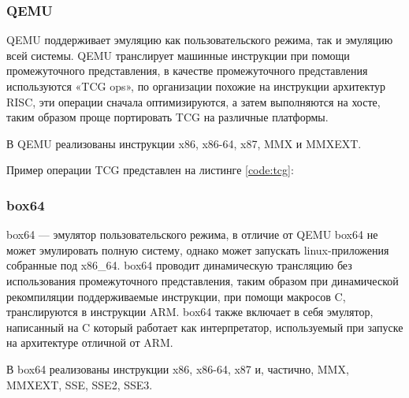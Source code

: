 \subsubsection{QEMU}

QEMU поддерживает эмуляцию как пользовательского режима, так и эмуляцию всей системы. QEMU транслирует машинные инструкции при помощи промежуточного представления, в качестве промежуточного представления используются «TCG ops», по организации похожие на инструкции архитектур RISC, эти операции сначала оптимизируются, а затем выполняются на хосте, таким образом проще портировать TCG на различные платформы. \cite{qemu_readme}

В QEMU реализованы инструкции x86, x86-64, x87, MMX и MMXEXT. 

Пример операции TCG представлен на листинге \ref{code:tcg}:


\subsubsection{box64}

box64 --- эмулятор пользовательского режима, в отличие от QEMU box64 не может эмулировать полную систему, однако может запускать linux-приложения собранные под x86\_64. box64 проводит динамическую трансляцию без использования промежуточного представления, таким образом при динамической рекомпиляции поддерживаемые инструкции, при помощи макросов C, транслируются в инструкции ARM. box64 также включает в себя эмулятор, написанный на C который работает как интерпретатор, используемый при запуске на архитектуре отличной от ARM. \cite{box64_letter}

В box64 реализованы инструкции x86, x86-64, x87 и, частично, MMX, MMXEXT, SSE, SSE2, SSE3. 

